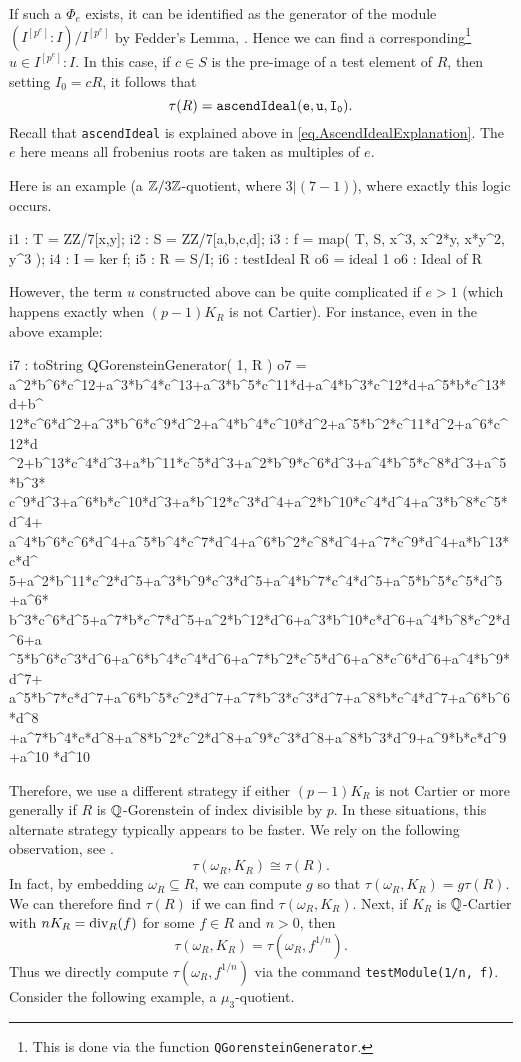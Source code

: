 \documentclass{amsart}
\begin{document}
If such a $\Phi_e$ exists, it can be identified as the generator of the module $(I^{[p^e]} : I) / I^{[p^e]}$ by Fedder's Lemma, \cite{FedderFPureRat}.  Hence we can find a corresponding\footnote{This is done via the function \texttt{QGorensteinGenerator}. } $u \in I^{[p^e]} : I$.  In this case, if $c \in S$ is the pre-image of a test element of $R$, then setting $I_0 = cR$, it follows that
\[
\tau(R) = {\tt ascendIdeal(e, u, I_0)}.
\]
Recall that \texttt{ascendIdeal} is explained above in \autoref{eq.AscendIdealExplanation}.  The $e$ here means all frobenius roots are taken as multiples of $e$.

Here is an example (a $\mathbb{Z}/3\mathbb{Z}$-quotient, where $3 | (7-1)$), where exactly this logic occurs.

\medskip
{\small
\begin{MyVerbatim}
i1 : T = ZZ/7[x,y];
i2 : S = ZZ/7[a,b,c,d];
i3 : f = map( T, S, { x^3, x^2*y, x*y^2, y^3 } );
i4 : I = ker f;
i5 : R = S/I;
i6 : testIdeal R
o6 = ideal 1
o6 : Ideal of R
\end{MyVerbatim}
}\medskip

However, the term $u$ constructed above can be quite complicated if $e > 1$ (which happens exactly when $(p -1)K_R$ is not Cartier).  For instance, even in the above example:

\medskip
{\small
\begin{MyVerbatim}
i7 : toString QGorensteinGenerator( 1, R )
o7 = a^2*b^6*c^12+a^3*b^4*c^13+a^3*b^5*c^11*d+a^4*b^3*c^12*d+a^5*b*c^13*d+b^
     12*c^6*d^2+a^3*b^6*c^9*d^2+a^4*b^4*c^10*d^2+a^5*b^2*c^11*d^2+a^6*c^12*d
     ^2+b^13*c^4*d^3+a*b^11*c^5*d^3+a^2*b^9*c^6*d^3+a^4*b^5*c^8*d^3+a^5*b^3*
     c^9*d^3+a^6*b*c^10*d^3+a*b^12*c^3*d^4+a^2*b^10*c^4*d^4+a^3*b^8*c^5*d^4+
     a^4*b^6*c^6*d^4+a^5*b^4*c^7*d^4+a^6*b^2*c^8*d^4+a^7*c^9*d^4+a*b^13*c*d^
     5+a^2*b^11*c^2*d^5+a^3*b^9*c^3*d^5+a^4*b^7*c^4*d^5+a^5*b^5*c^5*d^5+a^6*
     b^3*c^6*d^5+a^7*b*c^7*d^5+a^2*b^12*d^6+a^3*b^10*c*d^6+a^4*b^8*c^2*d^6+a
     ^5*b^6*c^3*d^6+a^6*b^4*c^4*d^6+a^7*b^2*c^5*d^6+a^8*c^6*d^6+a^4*b^9*d^7+
     a^5*b^7*c*d^7+a^6*b^5*c^2*d^7+a^7*b^3*c^3*d^7+a^8*b*c^4*d^7+a^6*b^6*d^8
     +a^7*b^4*c*d^8+a^8*b^2*c^2*d^8+a^9*c^3*d^8+a^8*b^3*d^9+a^9*b*c*d^9+a^10
     *d^10
\end{MyVerbatim}
}\medskip

Therefore, we use a different strategy if either $(p-1)K_R$ is not Cartier or more generally if $R$ is $\mathbb{Q}$-Gorenstein of index divisible by $p$.   In these situations, this alternate strategy typically appears to be faster.  We rely on the following observation, see \cite{BlickleSchwedeTuckerTestAlterations}.
\[
\tau(\omega_R, K_R) \cong \tau(R).
\]
In fact, by embedding $\omega_R \subseteq R$, we can compute $g$ so that $\tau(\omega_R, K_R) = g \tau(R)$.  We can therefore find $\tau(R)$ if we can find $\tau(\omega_R, K_R)$.
Next, if $K_R$ is $\mathbb{Q}$-Cartier with $nK_R = \operatorname{{div}}_R(f)$ for some $f \in R$ and $n > 0$, then
\[
\tau(\omega_R, K_R) =\tau(\omega_R, f^{1/n}).
\]
Thus we directly compute $\tau(\omega_R, f^{1/n})$ via the command \texttt{testModule(1/n, f)}.  Consider the following example, a $\mu_3$-quotient.
\end{document}
